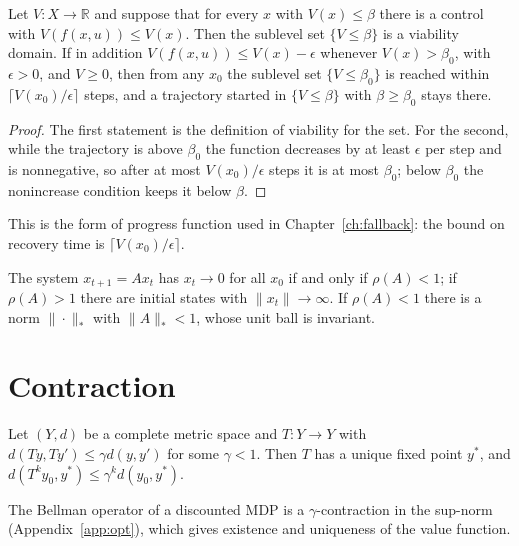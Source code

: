 \begin{newresult}\label{d:lyap}
Let $V:X\to\mathbb R$ and suppose that for every $x$ with $V(x)\le\beta$ there is a control with $V(f(x,u))\le V(x)$. Then the sublevel set $\{V\le\beta\}$ is a viability domain. If in addition $V(f(x,u))\le V(x)-\epsilon$ whenever $V(x)>\beta_0$, with $\epsilon>0$, and $V\ge0$, then from any $x_0$ the sublevel set $\{V\le\beta_0\}$ is reached within $\lceil V(x_0)/\epsilon\rceil$ steps, and a trajectory started in $\{V\le\beta\}$ with $\beta\ge\beta_0$ stays there.
\end{newresult}
\begin{proof}
The first statement is the definition of viability for the set. For the second, while the trajectory is above $\beta_0$ the function decreases by at least $\epsilon$ per step and is nonnegative, so after at most $V(x_0)/\epsilon$ steps it is at most $\beta_0$; below $\beta_0$ the nonincrease condition keeps it below $\beta$. 
\end{proof}

This is the form of progress function used in Chapter~\ref{ch:fallback}: the bound on recovery time is $\lceil V(x_0)/\epsilon\rceil$.

\begin{established}\label{d:linear}
The system $x_{t+1}=Ax_t$ has $x_t\to0$ for all $x_0$ if and only if $\rho(A)<1$; if $\rho(A)>1$ there are initial states with $\|x_t\|\to\infty$. If $\rho(A)<1$ there is a norm $\|\cdot\|_*$ with $\|A\|_*<1$, whose unit ball is invariant.
\end{established}

\section{Contraction}

\begin{established}\label{d:banach}
Let $(Y,d)$ be a complete metric space and $T:Y\to Y$ with $d(Ty,Ty')\le\gamma d(y,y')$ for some $\gamma<1$. Then $T$ has a unique fixed point $y^*$, and $d(T^ky_0,y^*)\le\gamma^kd(y_0,y^*)$.
\end{established}

The Bellman operator of a discounted MDP is a $\gamma$-contraction in the sup-norm (Appendix~\ref{app:opt}), which gives existence and uniqueness of the value function.

